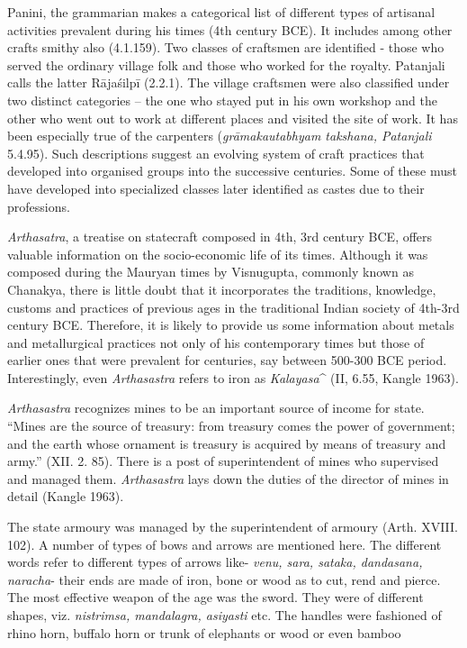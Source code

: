 Panini, the grammarian makes a categorical list of different types of artisanal activities prevalent during his times (4th century BCE). It includes among other crafts smithy also (4.1.159). Two classes of craftsmen are identified - those who served the ordinary village folk and those who worked for the royalty. Patanjali calls the latter Rājaśilpī (2.2.1). The village craftsmen were also classified under two distinct categories – the one who stayed put in his own workshop and the other who went out to work at different places and visited the site of work. It has been especially true of the carpenters (\textit{grāmakautabhyam takshana, Patanjali} 5.4.95). Such descriptions suggest an evolving system of craft practices that developed into organised groups into the successive centuries. Some of these must have developed into specialized classes later identified as castes due to their professions.

\textit{Arthasatra}, a treatise on statecraft composed in 4th, 3rd century BCE, offers valuable information on the socio-economic life of its times. Although it was composed during the Mauryan times by Visnugupta, commonly known as Chanakya, there is little doubt that it incorporates the traditions, knowledge, customs and practices of previous ages in the traditional Indian society of 4th-3rd century BCE. Therefore, it is likely to provide us some information about metals and metallurgical practices not only of his contemporary times but those of earlier ones that were prevalent for centuries, say between 500-300 BCE period. Interestingly, even \textit{Arthasastra} refers to iron as \textit{Kalayasa}^ (II, 6.55, Kangle 1963).

\textit{Arthasastra} recognizes mines to be an important source of income for state. “Mines are the source of treasury: from treasury comes the power of government; and the earth whose ornament is treasury is acquired by means of treasury and army.” (XII. 2. 85). There is a post of superintendent of mines who supervised and managed them. \textit{Arthasastra} lays down the duties of the director of mines in detail (Kangle 1963).

The state armoury was managed by the superintendent of armoury (Arth. XVIII. 102). A number of types of bows and arrows are mentioned here. The different words refer to different types of arrows like- \textit{venu, sara, sataka, dandasana, naracha}- their ends are made of iron, bone or wood as to cut, rend and pierce. The most effective weapon of the age was the sword. They were of different shapes, viz. \textit{nistrimsa, mandalagra, asiyasti} etc. The handles were fashioned of rhino horn, buffalo horn or trunk of elephants or wood or even bamboo

